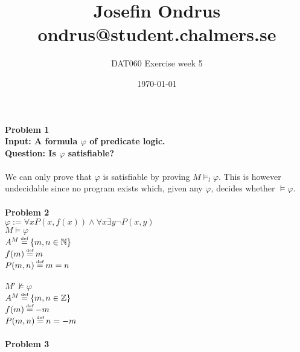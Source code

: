 \documentclass[12pt,oneside,reqno]{amsart}
\begin{document}
\setlength{\parindent}{6pt}
\def\code#1{\texttt{#1}} %
\def\ra{\rightarrow{}} %
\newcommand{\itab}[1]{\hspace{0em}\rlap{#1}}
\newcommand{\tab}[1]{\hspace{.2\textwidth}\rlap{#1}}
\newcommand\deff{\mathrel{\stackrel{\makebox[0pt]{\mbox{\normalfont\tiny def}}}{=}}}
\raggedbottom

\title{Josefin Ondrus\\ondrus@student.chalmers.se}
\author{DAT060 Exercise week 5}
\date{\today}
\maketitle

\textbf{Problem 1}\\
\textbf{Input: A formula $\varphi$ of predicate logic.}\\
\textbf{Question: Is $\varphi$ satisfiable?}\\\\
We can only prove that $\varphi$ is satisfiable by proving $M \models_l \varphi$.
This is however undecidable since no program exists which, given any $\varphi$, decides whether $\models \varphi$.\\\\

\textbf{Problem 2}\\
\textbf{$\varphi := \forall xP(x,f(x)) \land \forall x\exists y \neg P(x,y)$}\\

\textbf{$M \models \varphi$}\\
$A^M \deff \{m,n \in \mathbb{N}\}$\\
$f(m) \deff m$\\
$P(m,n) \deff m=n$\\\\
\textbf{$M' \not\models \varphi$}\\
$A^M \deff \{m,n \in \mathbb{Z}\}$\\
$f(m) \deff -m$\\
$P(m,n) \deff n=-m$\\\\

\textbf{Problem 3}\\
\end{document}
